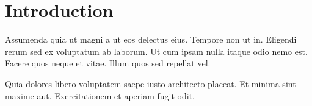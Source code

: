 \chapter*{Introduction}

Assumenda quia ut magni a ut eos delectus eius. Tempore non ut in. Eligendi rerum sed ex voluptatum ab laborum. Ut cum ipsam nulla itaque odio nemo est. Facere quos neque et vitae. Illum quos sed repellat vel.

Quia dolores libero voluptatem saepe iusto architecto placeat. Et minima sint maxime aut. Exercitationem et aperiam fugit odit.
